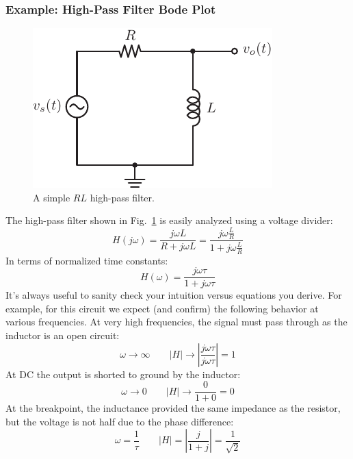 \subsubsection{Example: High-Pass Filter Bode Plot}
\begin{figure}[tb]
\begin{center}
\includegraphics[angle=-0.0,width=.4\columnwidth]{mod1_3_8_rl_hpf}
\end{center}
\caption{A simple $RL$ high-pass filter.}
\label{fig:hpf}
\end{figure}
The high-pass filter shown in Fig.~\ref{fig:hpf}  is easily analyzed using a voltage divider:
    \begin{equation}
        H(j\omega ) = \frac{{j\omega L}}{{R + j\omega L}} = \frac{{j\omega \frac{L}{R}}}{{1 + j\omega \frac{L}{R}}}
    \end{equation}
In terms of normalized time constants:
    \begin{equation}
        H(\omega ) = \frac{{j\omega \tau }}{{1 + j\omega \tau }}
    \end{equation}
It's always useful to sanity check your intuition versus equations you derive.  For example, for this circuit we expect (and confirm) the following behavior at various frequencies.  At very high frequencies, the signal must pass through as the inductor is an open circuit:
    \begin{equation}
        \omega  \to \infty  \quad\quad  \left| H \right| \to \left| {\frac{{j\omega \tau }}{{j\omega \tau }}} \right| = 1
    \end{equation}
At DC the output is shorted to ground by the inductor:
    \begin{equation}
        \omega  \to 0  \quad\quad \left| H \right| \to \frac{0}{{1 + 0}} = 0
    \end{equation}
At the breakpoint, the inductance provided the same impedance as the resistor, but the voltage is not half due to the phase difference:
    \begin{equation}
        \omega  = \frac{1}{\tau }  \quad\quad  \left| H \right| = \left| {\frac{j}{{1 + j}}} \right| = \frac{1}{{\sqrt 2 }}
    \end{equation}
